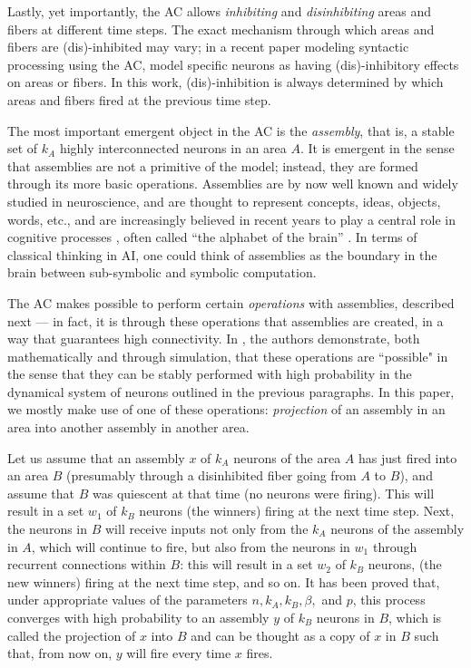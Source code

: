 \documentclass[letterpaper]{article}
\begin{document}
Lastly, yet importantly, the AC allows {\em inhibiting} and {\em disinhibiting} areas and fibers at different time steps. The exact mechanism through which areas and fibers are (dis)-inhibited may vary; in a recent paper modeling syntactic processing using the AC, \cite{mitropolsky_biologically_2021} model specific neurons as having (dis)-inhibitory effects on areas or fibers. In this work, (dis)-inhibition is always determined by which areas and fibers fired at the previous time step.


The most important emergent object in the AC is the {\em assembly}, that is, a stable set of $k_A$ highly interconnected neurons in an area $A$. It is emergent in the sense that assemblies are not a primitive of the model; instead, they are formed through its more basic operations. Assemblies are by now well known and widely studied in neuroscience, and are thought to represent concepts, ideas, objects, words, etc., and are increasingly believed in recent years to play a central role in cognitive processes \cite{buzsaki_neural_2010}, often called ``the alphabet of the brain'' \cite{buzsaki_brain_2021}. In terms of classical thinking in AI, one could think of assemblies as the boundary in the brain between sub-symbolic and symbolic computation.

The AC makes possible to perform certain {\em operations} with assemblies, described next --- in fact, it is through these operations that assemblies are created, in a way that guarantees high connectivity. In \cite{papadimitriou2020}, the authors demonstrate, both mathematically and through simulation, that these operations are ``possible" in the sense that they can be stably performed with high probability in the dynamical system of neurons outlined in the previous paragraphs.   
In this paper, we mostly make use of one of these operations: {\em projection} of an assembly in an area into another assembly in another area. 

Let us assume that an assembly $x$ of $k_A$ neurons of the area $A$ has just fired into an area $B$ (presumably through a disinhibited fiber going from $A$ to $B$), and assume that $B$ was quiescent at that time (no neurons were firing).  This will result in a set $w_1$ of $k_B$ neurons (the winners) firing at the next time step. Next, the neurons in $B$ will receive inputs not only from the $k_A$ neurons of the assembly in $A$, which will continue to fire, but also from the neurons in $w_1$ through recurrent connections within $B$: this will result in a set $w_2$ of $k_B$ neurons, (the new winners) firing at the next time step, and so on. It has been proved that, under appropriate values of the parameters $n, k_A, k_B, \beta,$ and $p$, this process converges with high probability to an assembly $y$ of $k_B$ neurons in $B$, which is called the projection of $x$ into $B$ and can be thought as a copy of $x$ in $B$ such that, from now on, $y$ will fire every time $x$ fires.
\end{document}
